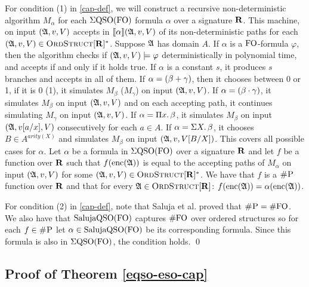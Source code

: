 For condition (1) in \ref{cap-def}, we will construct a recursive non-deterministic algorithm $M_{\alpha}$ for each $\Sigma{\rm QSO}({\rm FO})$ formula $\alpha$ over a signature $\mathbf{R}$. This machine, on input $(\mathfrak{A},v,V)$ accepts in ${\llbracket{}{\alpha}\rrbracket}(\mathfrak{A},v,V)$ of its non-deterministic paths for each $(\mathfrak{A},v,V) \in \text{\sc OrdStruct}[\mathbf{R}]^*$. Suppose $\mathfrak{A}$ has domain $A$. If $\alpha$ is a ${\rm FO}$-formula $\varphi$, then the algorithm checks if $(\mathfrak{A},v,V)\models\varphi$ deterministically in polynomial time, and accepts if and only if it holds true. If $\alpha$ is a constant $s$, it produces $s$ branches and accepts in all of them. If $\alpha = (\beta + \gamma)$, then it chooses between 0 or 1, if it is 0 (1), it simulates $M_{\beta}$ ($M_{\gamma}$) on input $(\mathfrak{A},v,V)$. If $\alpha = (\beta \cdot \gamma)$, it simulates $M_{\beta}$ on input $(\mathfrak{A},v,V)$ and on each accepting path, it continues simulating $M_{\gamma}$ on input $(\mathfrak{A},v,V)$.%
If $\alpha = \Pi{x}.\,\beta$, it simulates $M_{\beta}$ on input $(\mathfrak{A},v[a/x],V)$ consecutively for each $a\in A$. If $\alpha = \Sigma{X}.\,\beta$, it chooses $B\in A^{arity(X)}$ and simulates $M_{\beta}$ on input $(\mathfrak{A},v,V[B/X])$. This covers all possible cases for $\alpha$. Let $\alpha$ be a formula in $\Sigma{\rm QSO}({\rm FO})$ over a signature $\mathbf{R}$ and let $f$ be a function over $\mathbf{R}$ such that $f({\rm enc}(\mathfrak{A}))$ is equal to the accepting paths of $M_{\alpha}$ on input $(\mathfrak{A},v,V)$ for some $(\mathfrak{A},v,V) \in \text{\sc OrdStruct}[\mathbf{R}]^*$. We have that $f$ is a $\text{\sc \#P}$ function over $\mathbf{R}$ and that for every $\mathfrak{A}\in\text{\sc OrdStruct}[\mathbf{R}]$: $f({\rm enc}(\mathfrak{A})) = \alpha({\rm enc}(\mathfrak{A}))$.

For condition (2) in \ref{cap-def}, note that Saluja et al. \cite{SalujaST95} proved that $\text{\sc \#P} = \#{\rm FO}$. We also have that $\text{\rm Saluja}{\rm QSO}({\rm FO})$ captures $\#{\rm FO}$ over ordered structures so for each $f\in \text{\sc \#P}$ let $\alpha \in \text{\rm Saluja}{\rm QSO}({\rm FO})$ be its corresponding formula. Since this formula is also in $\Sigma{\rm QSO}({\rm FO})$, the condition holds. \qed

\subsection{Proof of Theorem \ref{eqso-eso-cap}}

